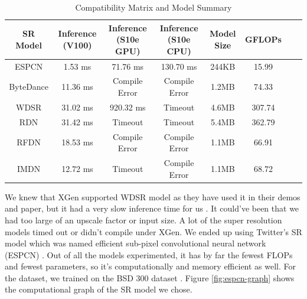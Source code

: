 \documentclass{article}
\begin{document}
\begin{table}[ht]
	\caption{Compatibility Matrix and Model Summary} %
	\centering %
	\begin{tabular}{c c c c c c c c } %
		\hline\hline %
		SR Model                             & Inference (V100) & Inference (S10e GPU) & Inference (S10e CPU) & Model Size & GFLOPs \\ [0.5ex] %
		\hline %
		ESPCN \cite{twitter-superresolution} & 1.53 ms          & 71.76 ms             & 130.70 ms            & 244KB      & 15.99  \\
		ByteDance \cite{ntire22}             & 11.36 ms         & Compile Error        & Compile Error        & 1.2MB      & 74.33  \\
		WDSR \cite{wdsr}                     & 31.02 ms         & 920.32 ms            & Timeout              & 4.6MB      & 307.74 \\
		RDN \cite{rdn}                       & 31.42 ms         & Timeout              & Timeout              & 5.4MB      & 362.79 \\
		RFDN \cite{ntire22}                  & 18.53 ms         & Compile Error        & Compile Error        & 1.1MB      & 66.91  \\
		IMDN \cite{ntire22}                  & 12.72 ms         & Timeout              & Compile Error        & 1.1MB      & 68.72  \\
		[1ex] %
		\hline %
	\end{tabular}
	\label{table:summary} %
\end{table}


We knew that XGen supported WDSR model as they have used it in their demos and paper, but it had a very slow inference time for us \cite{cocopie-xgen}. It could've been that we had too large of an upscale factor or input size. A lot of the super resolution models timed out or didn't compile under XGen. We ended up using Twitter's SR model which was named efficient sub-pixel convolutional neural network (ESPCN) \cite{twitter-superresolution}. Out of all the models experimented, it has by far the fewest FLOPs and fewest parameters, so it's computationally and memory efficient as well. For the dataset, we trained on the BSD 300 dataset \cite{bsd}. Figure \ref{fig:espcn-graph} shows the computational graph of the SR model we chose.
\end{document}
